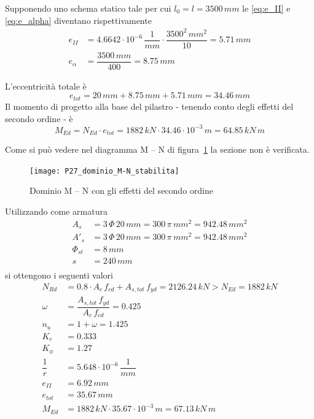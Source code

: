 Supponendo uno schema statico tale per cui $l_0 = l = 3500\,mm$ le \eqref{eq:e_II} e \eqref{eq:e_alpha} diventano rispettivamente
\begin{align*}
	e_{II} &= 4.6642\cdot 10^{-6}\,\dfrac{1}{mm}\cdot \dfrac{3500^2\,mm^2}{10} = 5.71\,mm\\
	e_\alpha &= \dfrac{3500\,mm}{400} = 8.75\,mm
\end{align*}

L'eccentricità totale è
\[
e_{tot} = 20\,mm + 8.75\,mm + 5.71\,mm = 34.46\,mm
\]
\noindent
Il momento di progetto alla base del pilastro - tenendo conto degli effetti del secondo ordine - è
\begin{equation}
    \label{eq:MEd_secondo_ordine}
	M_{Ed} = N_{Ed} \cdot e_{tot} = 1882\,kN\cdot 34.46\cdot 10^{-3}\,m = 64.85\,kN\,m
\end{equation}

Come si può vedere nel diagramma M -- N di figura~\ref{fig:P27_dominio_M-N_stabilita} la sezione non è verificata.
\begin{figure}
    \centering
	\texttt{[image: P27\_dominio\_M-N\_stabilita]}
	\caption{Dominio M -- N con gli effetti del secondo ordine}
	\label{fig:P27_dominio_M-N_stabilita}
\end{figure}


Utilizzando come armatura
\begin{align*}
    A_s &= 3\,\Phi\,20\,mm = 300\,\pi\,mm^2 = 942.48\,mm^2\\
	A'_s &= 3\,\Phi\,20\,mm = 300\,\pi\,mm^2 = 942.48\,mm^2\\
	\Phi_{st} &= 8\,mm\\
	s &= 240\,mm\\
\end{align*}
si ottengono i seguenti valori
\begin{align*}
	N_{Rd} &= 0.8\cdot A_c\,f_{cd} + A_{s,tot}\,f_{yd} = 2126.24\,kN > N_{Ed} = 1882\,kN\\
	\omega &= \dfrac{A_{s,tot}\,f_{yd}}{A_c\,f_{cd}} = 0.425\\
	n_u &= 1+\omega = 1.425\\
	K_r &= 0.333\\
	K_\phi &= 1.27\\
	\dfrac{1}{r} &= 5.648\cdot 10^{-6}\,\dfrac{1}{mm}\\
	e_{II} &= 6.92\,mm\\
	e_{tot} &= 35.67\,mm\\
	M_{Ed} &= 1882\,kN \cdot 35.67\cdot 10^{-3}\,m = 67.13\,kN\,m
\end{align*}

